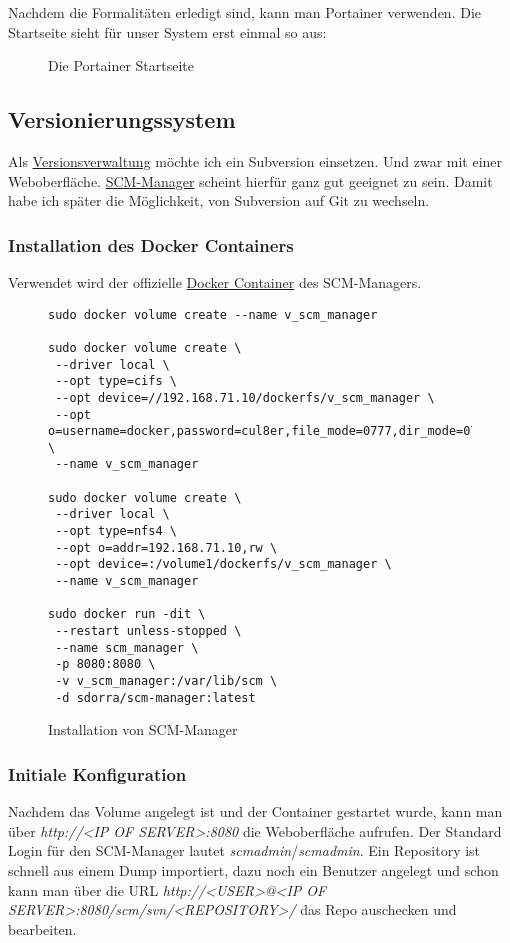 \documentclass[12pt,a4paper,ngerman]{article}
\newcommand{\code}[1]{\textit{#1}}
\newcommand{\jpaimg}[2]{\begin{figure}[H]\centering\fbox{\texttt{[image: \#1]}}\caption{#2}\label{fig:#2}\end{figure}}
\newcommand{\jpaquote}[1]{\glqq{}#1\grqq{}}
\newcommand{\jpacaption}[1]{\caption{#1}\label{fig:#1}}
\begin{document}
Nachdem die \jpaquote{Formalitäten} erledigt sind, kann man Portainer verwenden.
Die Startseite sieht für unser System erst einmal so aus:

\jpaimg{./images/Portainer-03.png}{Die Portainer Startseite}

\subsection{Versionierungssystem}\label{sub:SCM-Manager}
Als \href{https://de.wikipedia.org/wiki/Versionsverwaltung}{Versionsverwaltung}
möchte ich ein Subversion einsetzen. Und zwar mit einer Weboberfläche.
\href{https://www.scm-manager.org/}{SCM-Manager} scheint hierfür ganz gut
geeignet zu sein. Damit habe ich später die Möglichkeit, von Subversion auf Git
zu wechseln.

\subsubsection{Installation des Docker Containers}
Verwendet wird der offizielle
\href{https://hub.docker.com/r/sdorra/scm-manager}{Docker Container} des
SCM-Managers.

\begin{figure}[H]
    \begin{lstlisting}
sudo docker volume create --name v_scm_manager

sudo docker volume create \
 --driver local \
 --opt type=cifs \
 --opt device=//192.168.71.10/dockerfs/v_scm_manager \
 --opt o=username=docker,password=cul8er,file_mode=0777,dir_mode=0777 \
 --name v_scm_manager

sudo docker volume create \
 --driver local \
 --opt type=nfs4 \
 --opt o=addr=192.168.71.10,rw \
 --opt device=:/volume1/dockerfs/v_scm_manager \
 --name v_scm_manager

sudo docker run -dit \
 --restart unless-stopped \
 --name scm_manager \
 -p 8080:8080 \
 -v v_scm_manager:/var/lib/scm \
 -d sdorra/scm-manager:latest
\end{lstlisting}
    \jpacaption{Installation von SCM-Manager}
\end{figure}

\subsubsection{Initiale Konfiguration}
Nachdem das Volume angelegt ist und der Container gestartet wurde, kann man über
\code{http://<IP OF SERVER>:8080} die Weboberfläche aufrufen. Der Standard Login
für den SCM-Manager lautet \code{scmadmin}/\code{scmadmin}. Ein Repository ist
schnell aus einem Dump importiert, dazu noch ein Benutzer angelegt und schon
kann man über die URL \code{http://<USER>@<IP OF SERVER>:8080/scm/svn/<REPOSITORY>/}
das Repo auschecken und bearbeiten.
\end{document}
